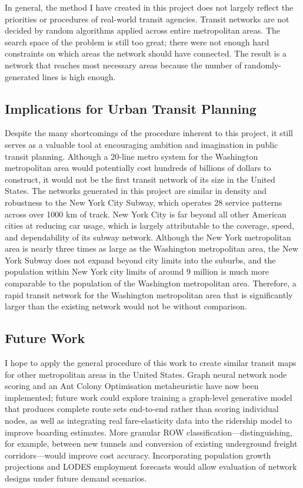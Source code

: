 \documentclass[sigconf,nonacm]{acmart}
\begin{document}
In general, the method I have created in this project does not largely reflect the priorities or procedures of real-world transit agencies. Transit networks are not decided by random algorithms applied across entire metropolitan areas. The search space of the problem is still too great; there were not enough hard constraints on which areas the network should have connected. The result is a network that reaches most necessary areas because the number of randomly-generated lines is high enough. 

\subsection{Implications for Urban Transit Planning}
Despite the many shortcomings of the procedure inherent to this project, it still serves as a valuable tool at encouraging ambition and imagination in public transit planning. Although a 20-line metro system for the Washington metropolitan area would potentially cost hundreds of billions of dollars to construct, it would not be the first transit network of its size in the United States. The networks generated in this project are similar in density and robustness to the New York City Subway, which operates 28 service patterns across over 1000 km of track. New York City is far beyond all other American cities at reducing car usage, which is largely attributable to the coverage, speed, and dependability of its subway network. Although the New York metropolitan area is nearly three times as large as the Washington metropolitan area, the New York Subway does not expand beyond city limits into the suburbs, and the population within New York city limits of around 9 million is much more comparable to the population of the Washington metropolitan area. Therefore, a rapid transit network for the Washington metropolitan area that is significantly larger than the existing network would not be without comparison. 

\subsection{Future Work}

I hope to apply the general procedure of this work to create similar transit maps for other metropolitan areas in the United States. Graph neural network node scoring and an Ant Colony Optimisation metaheuristic have now been implemented; future work could explore training a graph-level generative model that produces complete route sets end-to-end rather than scoring individual nodes, as well as integrating real fare-elasticity data into the ridership model to improve boarding estimates. More granular ROW classification---distinguishing, for example, between new tunnels and conversion of existing underground freight corridors---would improve cost accuracy. Incorporating population growth projections and LODES employment forecasts would allow evaluation of network designs under future demand scenarios. 
\end{document}
